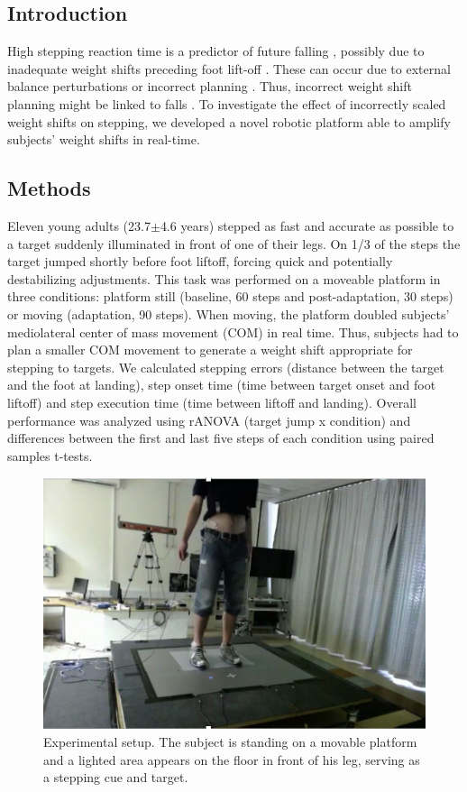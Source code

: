 
\subsection{Introduction} 
High stepping reaction time is a predictor of future falling \cite{Lord2001}, possibly due to inadequate weight shifts preceding foot lift-off \cite{Cohen2011}\cite{Sparto2013}. These can occur due to external balance perturbations \cite{Mille2014} or incorrect planning \cite{Cohen2011}\cite{Sparto2013}. Thus, incorrect weight shift planning might be linked to falls \cite{Robinovitch2013}. To investigate the effect of incorrectly scaled weight shifts on stepping, we developed a novel robotic platform able to amplify subjects’ weight shifts in real-time.

\subsection{Methods}
Eleven young adults (23.7$\pm$4.6 years) stepped as fast and accurate as possible to a target suddenly illuminated in front of one of their legs. On 1/3 of the steps the target jumped shortly before foot liftoff, forcing quick and potentially destabilizing adjustments. This task was performed on a moveable platform in three conditions: platform still (baseline, 60 steps and post-adaptation, 30 steps) or moving (adaptation, 90 steps). When moving, the platform doubled subjects’ mediolateral center of mass movement (COM) in real time. Thus, subjects had to plan a smaller COM movement to generate a weight shift appropriate for stepping to targets.
We calculated stepping errors (distance between the target and the foot at landing), step onset time (time between target onset and foot liftoff) and step execution time (time between liftoff and landing). Overall performance was analyzed using rANOVA (target jump x condition) and differences between the first and last five steps of each condition using paired samples t-tests.

\begin{figure}[!ht]
	\centering
	\includegraphics[width=0.6\linewidth]{"Zrinka/methods"}
	\caption{Experimental setup. The subject is standing on a movable platform and a lighted area appears on the floor in front of his leg, serving as a stepping cue and target.}
	\label{fig:expSetup}
	\vspace{-4 mm}
\end{figure}

